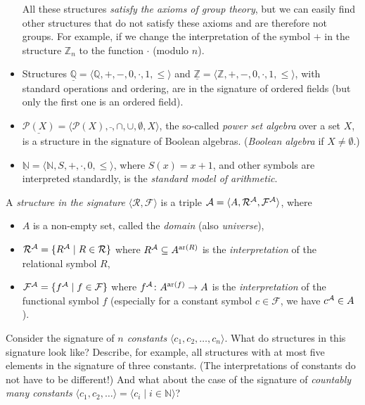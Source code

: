 \begin{example}
\begin{itemize}
\begin{itemize}
    \end{itemize}
    All these structures \emph{satisfy the axioms of group theory}, but we can easily find other structures that do not satisfy these axioms and are therefore not groups. For example, if we change the interpretation of the symbol $+$ in the structure $\mathbb Z_n$ to the function $\cdot$ (modulo $n$).
    \item Structures $\underline{\mathbb Q}=\langle \mathbb Q, +, -, 0,\cdot,1,\leq\rangle$ and $\underline{\mathbb Z}=\langle \mathbb Z, +, -, 0,\cdot,1,\leq\rangle$, with standard operations and ordering, are in the signature of ordered fields (but only the first one is an ordered field).
    \item $\underline{\mathcal P(X)}=\langle \mathcal P(X),\bar{},\cap,\cup,\emptyset,X\rangle$, the so-called \emph{power set algebra} over a set $X$, is a structure in the signature of Boolean algebras. (\emph{Boolean algebra} if $X\neq\emptyset$.)
    \item $\underline{\mathbb N}=\langle \mathbb N,S,+,\cdot,0,\leq\rangle$, where $S(x)=x+1$, and other symbols are interpreted standardly, is the \emph{standard model of arithmetic}.
\end{itemize}
\end{example}

\begin{definition}[Structure]
A \emph{structure in the signature} $\langle\mathcal R,\mathcal F\rangle$ is a triple $\mathcal{A}=\langle A, \mathcal R^{\mathcal{A}},\mathcal F^{\mathcal{A}} \rangle$, where
\begin{itemize}
   \item  $A$ is a non-empty set, called the \emph{domain} (also \emph{universe}),
   \item $\mathcal R^{\mathcal{A}}=\{R^{\mathcal{A}}\mid R\in\mathcal R\}$ where $R^{\mathcal{A}}\subseteq A^{\mathrm{ar}(R)}$ is the \emph{interpretation} of the relational symbol $R$,
   \item $\mathcal F^{\mathcal{A}}=\{f^{\mathcal{A}}\mid f\in\mathcal F\}$ where $f^{\mathcal{A}}\colon A^{\mathrm{ar}(f)}\to A$ is the \emph{interpretation} of the functional symbol $f$ (especially for a constant symbol $c\in\mathcal F$, we have $c^{\mathcal{A}}\in A$).
\end{itemize}
\end{definition}

\begin{exercise}
Consider the signature of \emph{$n$ constants} $\langle c_1,c_2,\dots,c_n\rangle$. What do structures in this signature look like? Describe, for example, all structures with at most five elements in the signature of three constants. (The interpretations of constants do not have to be different!)
And what about the case of the signature of \emph{countably many constants} $\langle c_1,c_2,\dots\rangle=\langle c_i\mid i\in\mathbb N\rangle$?
\end{exercise}


